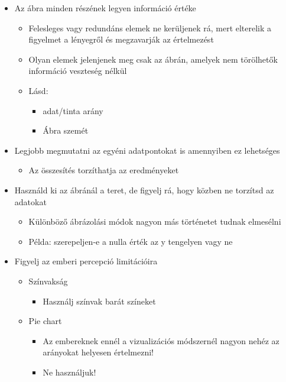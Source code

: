 \documentclass[
  letterpaper,
  DIV=11,
  numbers=noendperiod]{scrreprt}
\providecommand{\tightlist}{%
  \setlength{\itemsep}{0pt}\setlength{\parskip}{0pt}}\usepackage{longtable,booktabs,array}
\begin{document}
\begin{itemize}
\item
  Az ábra minden részének legyen információ értéke

  \begin{itemize}
  \item
    Felesleges vagy redundáns elemek ne kerüljenek rá, mert elterelik a
    figyelmet a lényegről és megzavarják az értelmezést
  \item
    Olyan elemek jelenjenek meg csak az ábrán, amelyek nem törölhetők
    információ veszteség nélkül
  \item
    Lásd:

    \begin{itemize}
    \item
      adat/tinta arány
    \item
      Ábra szemét
    \end{itemize}
  \end{itemize}
\item
  Legjobb megmutatni az egyéni adatpontokat is amennyiben ez lehetséges

  \begin{itemize}
  \tightlist
  \item
    Az összesítés torzíthatja az eredményeket
  \end{itemize}
\item
  Használd ki az ábránál a teret, de figyelj rá, hogy közben ne torzítsd
  az adatokat

  \begin{itemize}
  \item
    Különböző ábrázolási módok nagyon más történetet tudnak elmesélni
  \item
    Példa: szerepeljen-e a nulla érték az y tengelyen vagy ne
  \end{itemize}
\item
  Figyelj az emberi percepció limitációira

  \begin{itemize}
  \item
    Színvakság

    \begin{itemize}
    \tightlist
    \item
      Használj színvak barát színeket
    \end{itemize}
  \item
    Pie chart

    \begin{itemize}
    \item
      Az embereknek ennél a vizualizációs módszernél nagyon nehéz az
      arányokat helyesen értelmezni!
    \item
      Ne használjuk!
    \end{itemize}
  \end{itemize}
\end{itemize}
\end{document}
